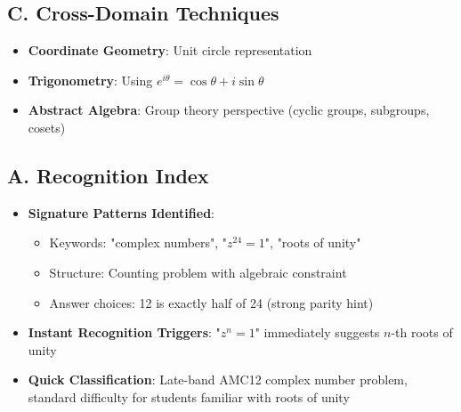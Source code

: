 \documentclass[]{article}
\begin{document}
\begin{tacticalbox}
\subsection*{C. Cross-Domain Techniques}
\begin{itemize}[leftmargin=*]
    \item \textbf{Coordinate Geometry}: Unit circle representation
    \item \textbf{Trigonometry}: Using $e^{i\theta} = \cos\theta + i\sin\theta$
    \item \textbf{Abstract Algebra}: Group theory perspective (cyclic groups, subgroups, cosets)
\end{itemize}
\end{tacticalbox}

\begin{techniquesbox}
\subsection*{A. Recognition Index}
\begin{itemize}[leftmargin=*]
    \item \textbf{Signature Patterns Identified}:
    \begin{itemize}
        \item Keywords: "complex numbers", "$z^{24} = 1$", "roots of unity"
        \item Structure: Counting problem with algebraic constraint
        \item Answer choices: 12 is exactly half of 24 (strong parity hint)
    \end{itemize}
    \item \textbf{Instant Recognition Triggers}: "$z^n = 1$" immediately suggests $n$-th roots of unity
    \item \textbf{Quick Classification}: Late-band AMC12 complex number problem, standard difficulty for students familiar with roots of unity
\end{itemize}


\end{techniquesbox}
\end{document}

